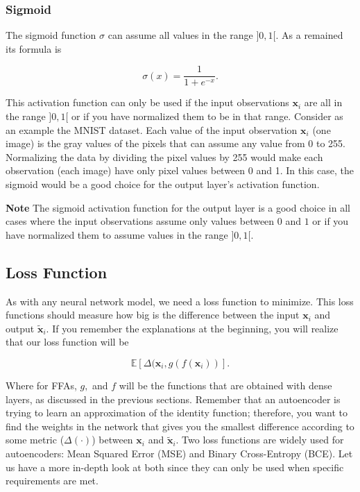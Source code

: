 \documentclass[12pt,a4]{article}
\newenvironment{note}
{\begin{mdframed}[backgroundcolor=light-gray, roundcorner=10pt,leftmargin=1, rightmargin=1, innerleftmargin=15, innertopmargin=15,innerbottommargin=15, outerlinewidth=1, linecolor=light-gray]}
{\end{mdframed}}
\begin{document}
\subsubsection{Sigmoid}

The sigmoid function \( \sigma\) can assume all values in the range \( ]0,1[\). As a remained its formula is


\begin{equation}
\sigma\left(x\right) =\frac{1}{1+e^{-x}}.
\end{equation}



This activation function can only be used if the input observations \(\mathbf{x}_{i}\) are all in the range \( ]0,1[\) or if you have normalized them to be in that range. Consider as an example the MNIST dataset. Each value of the input observation \(\mathbf{x}_{i}\) (one image) is the gray values of the pixels that can assume any value from 0 to  255. Normalizing the data by dividing the pixel values by 255 would make each observation (each image) have only pixel values between 0 and 1. In this case, the sigmoid would be a good choice for the output layer's activation function. 

\begin{note}
\textbf{Note }The sigmoid activation function for the output layer is a good choice in all cases where the input observations assume only values between \( 0\) and \( 1\) or if you have normalized them to assume values in the range \( ]0,1[\).
\end{note}

\subsection{Loss Function}

As with any neural network model, we need a loss function to minimize. This loss functions should measure how big is the difference between the input \(\mathbf{x}_{i}\) and output \(\tilde{\mathbf{x}}_{i}\). If you remember the explanations at the beginning, you will realize that our loss function will be


\begin{equation}
\mathbb{E}\left[\Delta (\mathbf{x}_{i}, g(f\left(\mathbf{x}_{i}\right))\right].
\end{equation}



Where for FFAs, \( g,\) and \( f\) will be the functions that are obtained with dense layers, as discussed in the previous sections. Remember that an autoencoder is trying to learn an approximation of the identity function; therefore, you want to find the weights in the network that gives you the smallest difference according to some metric (\( \Delta (\cdot)\)) between \(\mathbf{x}_{i}\) and \(\tilde{\mathbf{x}}_{i}\). Two loss functions are widely used for autoencoders:  Mean Squared Error (MSE) and Binary Cross-Entropy (BCE). Let us have a more in-depth look at both since they can only be used when specific requirements are met.
\end{document}
